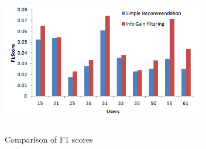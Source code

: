 \documentclass{article}
\begin{document}
\begin{figure}[H]
\includegraphics[height=2.5in, width=3.5in]{F1Score.png}
\caption{Comparison of F1 scores}
\label{f1score}
\end{figure}
\end{document}
